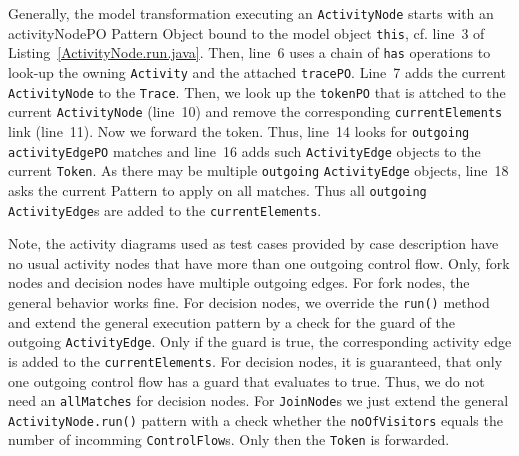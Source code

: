 \documentclass[submission,copyright,creativecommons]{eptcs}
\begin{document}
Generally, the model transformation executing an \texttt{ActivityNode} starts 
with an activityNodePO Pattern Object bound to the model object \texttt{this}, cf. line~3 of Listing~\ref{ActivityNode.run.java}. Then, line~6 uses a chain of \texttt{has} operations to look-up the owning \texttt{Activity} and the attached \texttt{tracePO}. Line~7 adds the current \texttt{ActivityNode} to the \texttt{Trace}. Then, we look up the \texttt{tokenPO} that is attched to the current \texttt{ActivityNode} (line~10) and remove the corresponding \texttt{currentElements} link (line~11). Now we forward the token. Thus, line~14 looks for \texttt{outgoing} \texttt{activityEdgePO} matches and line~16 adds such \texttt{ActivityEdge} objects to the current \texttt{Token}. As there may be multiple \texttt{outgoing} \texttt{ActivityEdge} objects, line~18 asks the current Pattern to apply on all matches. Thus all \texttt{outgoing} \texttt{ActivityEdge}s are added to the \texttt{currentElements}. 

Note, the activity diagrams used as test cases provided by case description have no usual activity nodes that have more than one outgoing control flow. Only, fork nodes and decision nodes have multiple outgoing edges. For fork nodes, the general behavior works fine. For decision nodes, we override the 
\texttt{run()} method and extend the general execution pattern by a check for the guard of the 
outgoing \texttt{ActivityEdge}. Only if the guard is true, the corresponding activity edge 
is added to the \texttt{currentElements}. For decision nodes, it is guaranteed, that only one 
outgoing control flow has a guard that evaluates to true. Thus, we do not need an \texttt{allMatches} for decision nodes. For \texttt{JoinNode}s we just extend the general \texttt{ActivityNode.run()} pattern with a check whether the \texttt{noOfVisitors} equals the number of incomming \texttt{ControlFlow}s. Only then the \texttt{Token} is forwarded.  
\end{document}
